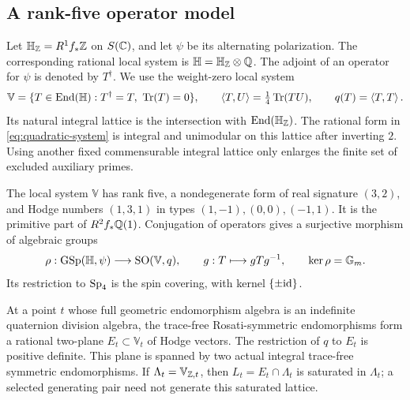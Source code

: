 \subsection{A rank-five operator model}

Let $\mathbb H_{\mathbb Z}=R^1f_*\mathbb Z$ on $S(\mathbb C)$, and let $\psi$ be its alternating
polarization.  The corresponding rational local system is
$\mathbb H=\mathbb H_{\mathbb Z}\otimes\mathbb Q$.  The adjoint of an operator for $\psi$
is denoted by $T^\dagger$.  We use the weight-zero local system
\begin{equation}\label{eq:quadratic-system}
 \mathbb V=\{T\in\operatorname{End}(\mathbb H):T^\dagger=T,\ \operatorname{Tr}(T)=0\},
 \qquad \left\langle T,U\right\rangle=\tfrac14\operatorname{Tr}(TU),\qquad q(T)=\left\langle T,T\right\rangle.
\end{equation}
Its natural integral lattice is the intersection with
$\operatorname{End}(\mathbb H_{\mathbb Z})$.  The rational form in
\eqref{eq:quadratic-system} is integral and unimodular on this lattice
after inverting $2$.  Using another fixed commensurable integral lattice
only enlarges the finite set of excluded auxiliary primes.

\begin{lemma}
\label{lem:qm-plane}
The local system $\mathbb V$ has rank five, a nondegenerate form of real
signature $(3,2)$, and Hodge numbers $(1,3,1)$ in types
$(1,-1),(0,0),(-1,1)$.  It is the primitive part of $R^2f_*\mathbb Q(1)$.
Conjugation of operators gives a surjective morphism of algebraic groups
\begin{equation}\label{eq:gsp-to-so}
 \rho:\operatorname{GSp}(\mathbb H,\psi)\longrightarrow\operatorname{SO}(\mathbb V,q),
 \qquad g:T\longmapsto gTg^{-1},
 \qquad \ker\rho=\mathbb G_m.
\end{equation}
Its restriction to $\operatorname{Sp}_4$ is the spin covering, with kernel
$\{\pm\mathrm{id}\}$.

At a point $t$ whose full geometric endomorphism algebra is an indefinite
quaternion division algebra, the trace-free Rosati-symmetric
endomorphisms form a rational two-plane
$E_t\subset\mathbb V_t$ of Hodge vectors.  The restriction of $q$ to $E_t$
is positive definite.  This plane is spanned by two actual integral
trace-free symmetric endomorphisms.  If $\Lambda_t=\mathbb V_{\mathbb Z,t}$, then
$L_t=E_t\cap\Lambda_t$ is saturated in $\Lambda_t$; a selected generating pair need not
generate this saturated lattice.
\end{lemma}

